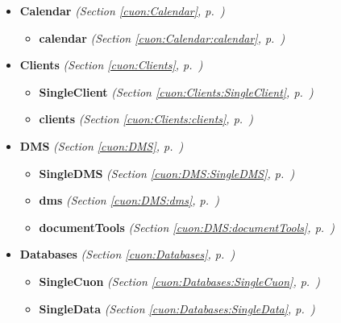 \begin{itemize}
\begin{itemize}
  \end{itemize}
\item \textbf{Calendar}
  \textit{(Section \ref{cuon:Calendar}, p.~\pageref{cuon:Calendar})}

  \begin{itemize}
\setlength{\parskip}{0ex}
    \item \textbf{calendar}
  \textit{(Section \ref{cuon:Calendar:calendar}, p.~\pageref{cuon:Calendar:calendar})}

  \end{itemize}
\item \textbf{Clients}
  \textit{(Section \ref{cuon:Clients}, p.~\pageref{cuon:Clients})}

  \begin{itemize}
\setlength{\parskip}{0ex}
    \item \textbf{SingleClient}
  \textit{(Section \ref{cuon:Clients:SingleClient}, p.~\pageref{cuon:Clients:SingleClient})}

    \item \textbf{clients}
  \textit{(Section \ref{cuon:Clients:clients}, p.~\pageref{cuon:Clients:clients})}

  \end{itemize}
\item \textbf{DMS}
  \textit{(Section \ref{cuon:DMS}, p.~\pageref{cuon:DMS})}

  \begin{itemize}
\setlength{\parskip}{0ex}
    \item \textbf{SingleDMS}
  \textit{(Section \ref{cuon:DMS:SingleDMS}, p.~\pageref{cuon:DMS:SingleDMS})}

    \item \textbf{dms}
  \textit{(Section \ref{cuon:DMS:dms}, p.~\pageref{cuon:DMS:dms})}

    \item \textbf{documentTools}
  \textit{(Section \ref{cuon:DMS:documentTools}, p.~\pageref{cuon:DMS:documentTools})}

  \end{itemize}
\item \textbf{Databases}
  \textit{(Section \ref{cuon:Databases}, p.~\pageref{cuon:Databases})}

  \begin{itemize}
\setlength{\parskip}{0ex}
    \item \textbf{SingleCuon}
  \textit{(Section \ref{cuon:Databases:SingleCuon}, p.~\pageref{cuon:Databases:SingleCuon})}

    \item \textbf{SingleData}
  \textit{(Section \ref{cuon:Databases:SingleData}, p.~\pageref{cuon:Databases:SingleData})}


\end{itemize}
\end{itemize}
